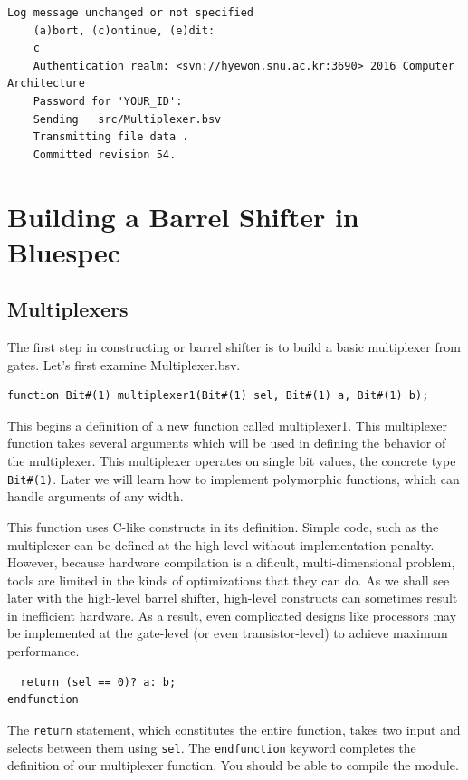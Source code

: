\documentclass{article}
\begin{document}
\begin{Verbatim}[frame=single]
    Log message unchanged or not specified
    (a)bort, (c)ontinue, (e)dit:
    c
    Authentication realm: <svn://hyewon.snu.ac.kr:3690> 2016 Computer Architecture
    Password for 'YOUR_ID':
    Sending   src/Multiplexer.bsv
    Transmitting file data .
    Committed revision 54.
\end{Verbatim}

\section{Building a Barrel Shifter in Bluespec}

\subsection{Multiplexers}

The first step in constructing or barrel shifter is to build a basic
multiplexer from gates. Let's first examine Multiplexer.bsv.

\begin{verbatim}
function Bit#(1) multiplexer1(Bit#(1) sel, Bit#(1) a, Bit#(1) b);
\end{verbatim}

This begins a definition of a new function called multiplexer1. This
multiplexer function takes several arguments which will be used in defining
the behavior of the multiplexer. This multiplexer operates on single bit values,
the concrete type \verb|Bit#(1)|. Later we will learn how to implement polymorphic
functions, which can handle arguments of any width.

This function uses C-like constructs in its definition. Simple code, such as
the multiplexer can be defined at the high level without implementation
penalty. However, because hardware compilation is a dificult, multi-dimensional
problem, tools are limited in the kinds of optimizations that they can do. As we
shall see later with the high-level barrel shifter, high-level constructs can
sometimes result in inefficient hardware. As a result, even complicated designs
like processors may be implemented at the gate-level (or even transistor-level)
to achieve maximum performance.
\begin{verbatim}
  return (sel == 0)? a: b;
endfunction
\end{verbatim}
The \texttt{return} statement, which constitutes the entire function, takes two input and
selects between them using \texttt{sel}. The \texttt{endfunction} keyword completes the
definition of our multiplexer function. You should be able to compile the module.
\end{document}
